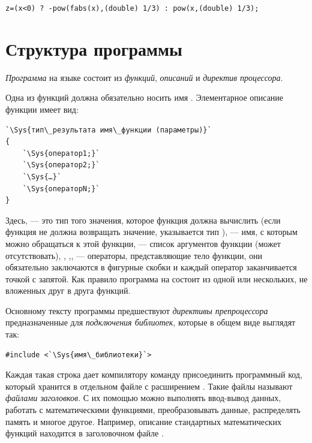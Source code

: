 \noindent\lstinline!z=(x<0) ? -pow(fabs(x),(double) 1/3) : pow(x,(double) 1/3);!

\section[Структура программы]{Структура программы}\label{ch02:8}
\emph{Программа} на языке  состоит из
\emph{функций}, \emph{описаний} и \emph{директив процессора}. 

Одна из функций должна обязательно носить имя . Элементарное описание функции имеет вид:

\begin{lstlisting}
`\Sys{тип\_результата имя\_функции (параметры)}`
{
    `\Sys{оператор1;}`
    `\Sys{оператор2;}`
    `\Sys{…}`
    `\Sys{операторN;}`
}
\end{lstlisting}

Здесь,  --- это тип того значения, которое функция должна вычислить (если функция не
должна возвращать значение, указывается тип ),  --- имя, с которым
можно обращаться к этой функции,  --- список аргументов функции (может отсутствовать),
, ,,  --- операторы, представляющие
тело функции, они обязательно заключаются в фигурные скобки и каждый оператор заканчивается точкой с запятой. Как
правило программа на  состоит из одной или нескольких, не вложенных друг в друга функций.

Основному тексту программы предшествуют \emph{директивы препроцессора}
предназначенные для \emph{подключения библиотек}, которые в общем виде
выглядят так:
\begin{lstlisting}
#include <`\Sys{имя\_библиотеки}`>
\end{lstlisting}

Каждая такая строка дает компилятору команду присоединить программный код, который хранится в отдельном файле с
расширением . Такие файлы называют \emph{файлами заголовков}. С их помощью можно
выполнять ввод-вывод данных, работать с математическими функциями, преобразовывать данные, распределять память и многое
другое. Например, описание стандартных математических функций находится в заголовочном файле .

